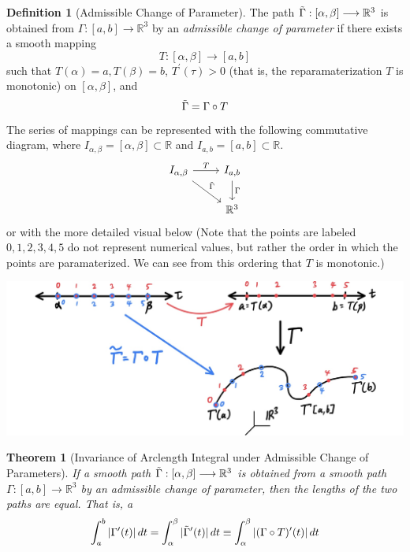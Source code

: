 \documentclass{article}
\newtheorem{theorem}{Theorem}[section]
\theoremstyle{remark}
\theoremstyle{definition}
\newtheorem{definition}{Definition}[section]
\begin{document}
\begin{definition}[Admissible Change of Parameter]
The path $\Tilde{\Gamma}: [\alpha, \beta] \longrightarrow \mathbb{R}^3$ is obtained from $\Gamma: [a, b] \longrightarrow \mathbb{R}^3$ by an \textit{admissible change of parameter} if there exists a smooth mapping 
\[T: [\alpha, \beta] \longrightarrow [a, b]\]
such that $T(\alpha) = a, T(\beta) = b$, $T^\prime (\tau) > 0$ (that is, the reparamaterization $T$ is monotonic) on $[\alpha, \beta]$, and 
\[\Tilde{\Gamma} = \Gamma \circ T\]
The series of mappings can be represented with the following commutative diagram, where $I_{\alpha, \beta} = [\alpha, \beta] \subset \mathbb{R}$ and $I_{a, b} = [a, b] \subset \mathbb{R}$. 
\[
  \begin{tikzcd}
    I_{\alpha, \beta} \arrow{r}{T} \arrow{rd}{\Tilde{\Gamma}}& I_{a, b} \arrow{d}{\Gamma}\\
     & \mathbb{R}^3
  \end{tikzcd}
\]
or with the more detailed visual below (Note that the points are labeled $0, 1, 2, 3, 4, 5$ do not represent numerical values, but rather the order in which the points are paramaterized. We can see from this ordering that $T$ is monotonic.)
\begin{center}
    \includegraphics[scale=0.3]{img/Admissible_Change_of_Parameter.jpg}
\end{center}
\end{definition}

\begin{theorem}[Invariance of Arclength Integral under Admissible Change of Parameters]
If a smooth path $\Tilde{\Gamma}: [\alpha, \beta] \longrightarrow \mathbb{R}^3$ is obtained from a smooth path $\Gamma: [a, b] \longrightarrow \mathbb{R}^3$ by an admissible change of parameter, then the lengths of the two paths are equal. That is, a
\[\int_a^b |\Gamma^\prime (t) |\,dt = \int_\alpha^\beta |\Tilde{\Gamma}^\prime (t)|\,dt \equiv \int_\alpha^\beta |(\Gamma \circ T)^\prime (t)|\,dt\]
\end{theorem}
\end{document}
